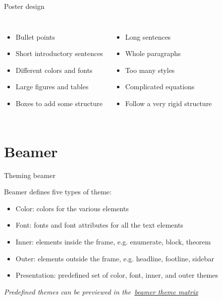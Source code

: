 \begin{framedd}{Poster design}

	\begin{columns}
		\column{\halfwidth}
		\medskip

		\raggedright 
		\begin{itemize}\bigsep 
			\item Bullet points 
			\item Short introductory sentences 
			\item Different colors and fonts 
			\item Large figures and tables
			\item Boxes to add some structure
		\end{itemize}

		\column{\halfwidth}
		\medskip 

		\raggedright
		\begin{itemize}\bigsep 
			\item Long sentences
			\item Whole paragraphs
			\item Too many styles
			\item Complicated equations
			\item Follow a very rigid structure
		\end{itemize}
	\end{columns}

\end{framedd}

\section{Beamer}

\begin{frame}{Theming beamer}

	Beamer defines five types of theme:
	\begin{itemize}
		\item Color: colors for the various elements
		\item Font: fonts and font attributes for all the text elements
		\item Inner: elements inside the frame, e.g. enumerate, block, theorem 
		\item Outer: elements outside the frame, e.g. headline, footline, sidebar 
	\item Presentation: predefined set of color, font, inner, and outer themes
	\end{itemize}
	\pause\bigskip

	\centering
	{\em Predefined themes can be  previewed in the~\href{https://www.hartwork.org/beamer-theme-matrix/}{beamer theme matrix}}
	
\end{frame}

